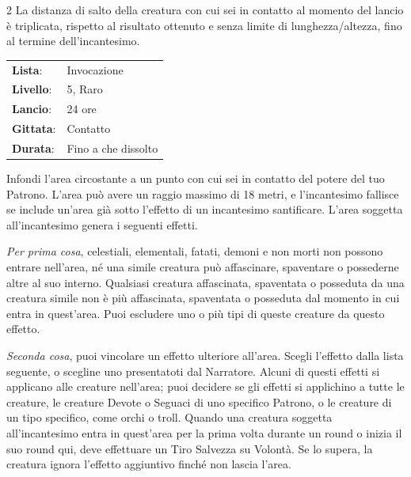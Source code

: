 \begin{multicols}{2}
La distanza di salto della creatura con cui sei in contatto al momento del lancio è triplicata, rispetto al risultato ottenuto e senza limite di lunghezza/altezza, fino al termine dell'incantesimo.

\noindent\begin{tabularx}{\linewidth}{p{1.9cm}X}
	\rowcolor{gray!20}\textbf{Lista}: & Invocazione \\
	\textbf{Livello}: & 5, Raro \\
	\rowcolor{gray!20}\textbf{Lancio}: & 24 ore \\
	\textbf{Gittata}: & Contatto \\
	\rowcolor{gray!20}\textbf{Durata}: & Fino a che dissolto \\
\end{tabularx}\smallskip

Infondi l'area circostante a un punto con cui sei in contatto del potere del tuo Patrono. L'area può avere un raggio massimo di 18 metri, e l'incantesimo fallisce se include un'area già sotto l'effetto di un incantesimo santificare. L'area soggetta all'incantesimo genera i seguenti effetti.

\emph{Per prima cosa}, celestiali, elementali, fatati, demoni e non morti non possono entrare nell'area, né una simile creatura può affascinare, spaventare o possederne altre al suo interno. Qualsiasi creatura affascinata, spaventata o posseduta da una creatura simile non è più affascinata, spaventata o posseduta dal momento in cui entra in quest'area. Puoi escludere uno o più tipi di queste creature da questo effetto.

\emph{Seconda cosa}, puoi vincolare un effetto ulteriore all'area. Scegli l'effetto dalla lista seguente, o scegline uno presentatoti dal Narratore. Alcuni di questi effetti si applicano alle creature nell'area; puoi decidere se gli effetti si applichino a tutte le creature, le creature Devote o Seguaci di uno specifico Patrono, o le creature di un tipo specifico, come orchi o troll. Quando una creatura soggetta all'incantesimo entra in quest'area per la prima volta durante un round o inizia il suo round qui, deve effettuare un Tiro Salvezza su Volontà. Se lo supera, la creatura ignora l'effetto aggiuntivo finché non lascia l'area.


\end{multicols}
